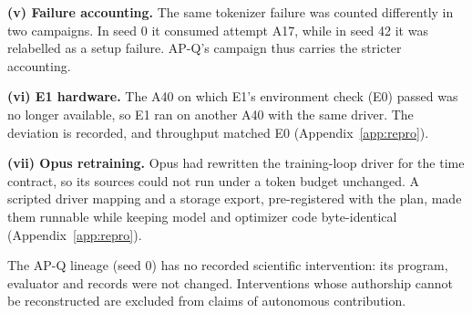 \documentclass{article}
\begin{document}
{\textbf{(v) Failure accounting.} The same tokenizer failure was counted differently in two campaigns. In seed 0 it consumed attempt A17, while in seed 42 it was relabelled as a setup failure. AP-Q's campaign thus carries the stricter accounting.

\textbf{(vi) E1 hardware.} The A40 on which E1's environment check (E0) passed was no longer available, so E1 ran on another A40 with the same driver. The deviation is recorded, and throughput matched E0 (Appendix~\ref{app:repro}).

\textbf{(vii) Opus retraining.} Opus had rewritten the training-loop driver for the time contract, so its sources could not run under a token budget unchanged. A scripted driver mapping and a storage export, pre-registered with the plan, made them runnable while keeping model and optimizer code byte-identical (Appendix~\ref{app:repro}).

The AP-Q lineage (seed 0) has no recorded scientific intervention: its program, evaluator and records were not changed. Interventions whose authorship cannot be reconstructed are excluded from claims of autonomous contribution.}
\end{document}
